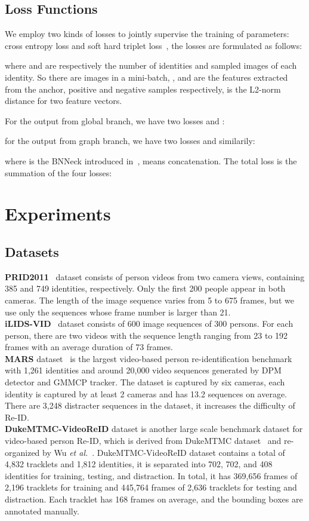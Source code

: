 \documentclass[journal]{IEEEtran}
\newcommand{\etal}{\textit{et al.}}
\begin{document}
\subsection{Loss Functions}\label{sec:optimization}
We employ two kinds of losses to jointly supervise the training of parameters: cross entropy loss and soft hard triplet loss~\cite{Hermans_2017_ArXiv}, the losses are formulated as follows:


where  and  are respectively the number of identities and sampled images of each identity. So there are  images in a mini-batch, ,  and  are the features extracted from the anchor, positive and negative samples respectively,  is the L2-norm distance for two feature vectors.

For the output from global branch, we have two losses  and :


for the output from graph branch, we have two losses  and  similarily:


where  is the BNNeck introduced in~\cite{Luo_2019_CVPRW},  means concatenation. The total loss is the summation of the four losses:


\section{Experiments}\label{sec:experiments}
\subsection{Datasets}
\textbf{PRID2011}~\cite{Wang_2014_ECCV} dataset consists of person videos from two camera views, containing 385 and 749 identities, respectively. Only the first 200 people appear in both cameras. The length of the image sequence varies from 5 to 675 frames, but we use only the sequences whose frame number is larger than 21. \\
\indent \textbf{iLIDS-VID}~\cite{Hirzer_2011_SCIA} dataset consists of 600 image sequences of 300 persons. For each person, there are two videos with the sequence length ranging from 23 to 192 frames with an average duration of 73 frames. \\
\indent \textbf{MARS} dataset~\cite{Zheng_2016_ECCV} is the largest video-based person re-identification benchmark with 1,261 identities and around 20,000 video sequences generated by DPM detector and GMMCP tracker. The dataset is captured by six cameras, each identity is captured by at least 2 cameras and has 13.2 sequences on average. There are 3,248 distracter sequences in the dataset, it increases the difficulty of Re-ID.\\
\indent \textbf{DukeMTMC-VideoReID} dataset is another large scale benchmark dataset for video-based person Re-ID, which is derived from DukeMTMC dataset~\cite{Ristani_2016_ECCVW} and re-organized by Wu \etal~\cite{Wu_2018_CVPR}. DukeMTMC-VideoReID dataset contains a total of 4,832 tracklets and 1,812 identities, it is separated into 702, 702, and 408 identities for training, testing, and distraction. In total, it has 369,656 frames of 2,196 tracklets for training and 445,764 frames of 2,636 tracklets for testing and distraction. Each tracklet has 168 frames on average, and the bounding boxes are annotated manually.
\end{document}
